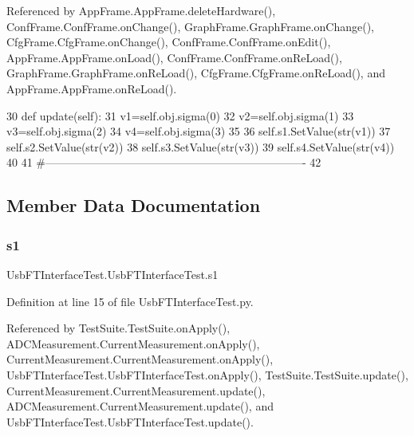 Referenced by App\+Frame.\+App\+Frame.\+delete\+Hardware(), Conf\+Frame.\+Conf\+Frame.\+on\+Change(), Graph\+Frame.\+Graph\+Frame.\+on\+Change(), Cfg\+Frame.\+Cfg\+Frame.\+on\+Change(), Conf\+Frame.\+Conf\+Frame.\+on\+Edit(), App\+Frame.\+App\+Frame.\+on\+Load(), Conf\+Frame.\+Conf\+Frame.\+on\+Re\+Load(), Graph\+Frame.\+Graph\+Frame.\+on\+Re\+Load(), Cfg\+Frame.\+Cfg\+Frame.\+on\+Re\+Load(), and App\+Frame.\+App\+Frame.\+on\+Re\+Load().


\begin{DoxyCode}
30     \textcolor{keyword}{def }update(self):
31         v1=self.obj.sigma(0)
32         v2=self.obj.sigma(1)
33         v3=self.obj.sigma(2)
34         v4=self.obj.sigma(3)
35 
36         self.s1.SetValue(str(v1))
37         self.s2.SetValue(str(v2))
38         self.s3.SetValue(str(v3))
39         self.s4.SetValue(str(v4))        
40 
41 \textcolor{comment}{#----------------------------------------------------------------------}
42 
\end{DoxyCode}


\subsection{Member Data Documentation}
\mbox{\label{classUsbFTInterfaceTest_1_1UsbFTInterfaceTest_aa48c66e3bd6051de27610031425aa5ec}} 
\subsubsection{\texorpdfstring{s1}{s1}}
{\footnotesize\ttfamily Usb\+F\+T\+Interface\+Test.\+Usb\+F\+T\+Interface\+Test.\+s1}



Definition at line 15 of file Usb\+F\+T\+Interface\+Test.\+py.



Referenced by Test\+Suite.\+Test\+Suite.\+on\+Apply(), A\+D\+C\+Measurement.\+Current\+Measurement.\+on\+Apply(), Current\+Measurement.\+Current\+Measurement.\+on\+Apply(), Usb\+F\+T\+Interface\+Test.\+Usb\+F\+T\+Interface\+Test.\+on\+Apply(), Test\+Suite.\+Test\+Suite.\+update(), Current\+Measurement.\+Current\+Measurement.\+update(), A\+D\+C\+Measurement.\+Current\+Measurement.\+update(), and Usb\+F\+T\+Interface\+Test.\+Usb\+F\+T\+Interface\+Test.\+update().


